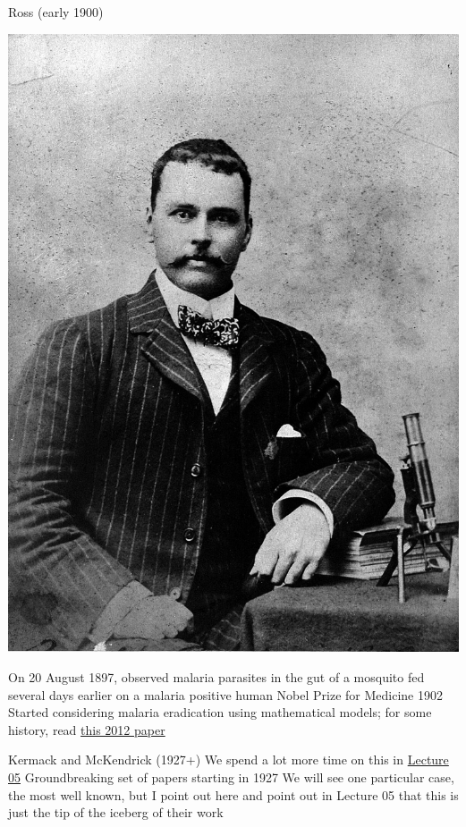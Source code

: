 \documentclass[aspectratio=169]{beamer}\usepackage[]{graphicx}\usepackage[]{xcolor}
\begin{document}
\begin{frame}{Ross (early 1900)}
\begin{minipage}{0.5\textwidth}
    \includegraphics[width=\textwidth]{FIGS/RonaldRoss_WellcomeCollection.jpg}
\end{minipage}
\begin{minipage}{0.47\textwidth}
\bbullet On 20 August 1897, observed malaria parasites in the gut of a mosquito fed several days earlier on a malaria positive human
\vfill
\bbullet Nobel Prize for Medicine 1902
\vfill
\bbullet Started considering malaria eradication using mathematical models; for some history, read \href{https://www.ncbi.nlm.nih.gov/pmc/articles/PMC3320609/pdf/ppat.1002588.pdf}{this 2012 paper}
\end{minipage}
\end{frame}


\begin{frame}{Kermack and McKendrick (1927+)}
\bbullet We spend a lot more time on this in \href{https://julien-arino.github.io/3MC-course-epidemiological-modelling/2022_04_3MC_EpiModelling_L02_BasicMathEpi.html}{Lecture 05}
\vfill
\bbullet Groundbreaking set of papers starting in 1927
\vfill
\bbullet We will see one particular case, the most well known, but I point out here and point out in Lecture 05 that this is just the tip of the iceberg of their work
\end{frame}
\end{document}
